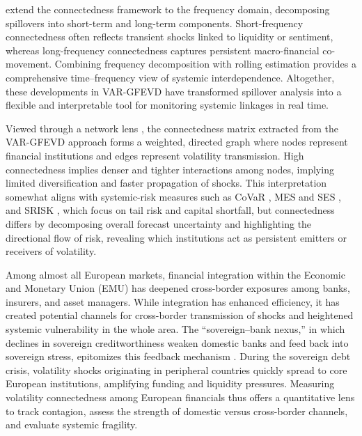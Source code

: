 \citet{BarunikKrehlik2018} extend the connectedness framework to the frequency domain,
decomposing spillovers into short-term and long-term components. Short-frequency
connectedness often reflects transient shocks linked to liquidity or sentiment, whereas
long-frequency connectedness captures persistent macro-financial co-movement. Combining
frequency decomposition with rolling estimation provides a comprehensive time--frequency
view of systemic interdependence.
Altogether, these developments in VAR-GFEVD have transformed spillover analysis into a flexible and interpretable tool for monitoring systemic linkages in real time.

Viewed through a network lens \citep{jonkleinberg2010networks, barabasi2016network, Glasserman_Young_2015}, the connectedness matrix extracted from the VAR-GFEVD approach forms a weighted, directed graph
where nodes represent financial institutions and edges represent volatility transmission.
High connectedness implies denser and tighter interactions among nodes, implying limited diversification and faster
propagation of shocks. This interpretation somewhat aligns with systemic-risk measures such as
CoVaR \citep{AdrianBrunnermeier2016}, MES and SES \citep{Acharya2017}, and SRISK
\citep{BrownleesEngle2017}, which focus on tail risk and capital shortfall, but
connectedness differs by decomposing overall forecast uncertainty and highlighting the
directional flow of risk, revealing which institutions act as persistent emitters or
receivers of volatility.


Among almost all European markets, financial integration within the Economic and Monetary Union (EMU) has deepened
cross-border exposures among banks, insurers, and asset managers. While integration has
enhanced efficiency, it has created potential channels for cross-border transmission of shocks and heightened systemic vulnerability in the whole area. The
``sovereign--bank nexus,'' in which declines in sovereign creditworthiness weaken
domestic banks and feed back into sovereign stress, epitomizes this feedback mechanism
\citep{BlackCorreaHuangZhou2016,BonaldiHortacsuKastl2015}. During the sovereign debt
crisis, volatility shocks originating in peripheral countries quickly spread to core
European institutions, amplifying funding and liquidity pressures. Measuring volatility
connectedness among European financials thus offers a quantitative lens to track
contagion, assess the strength of domestic versus cross-border channels, and evaluate
systemic fragility.



